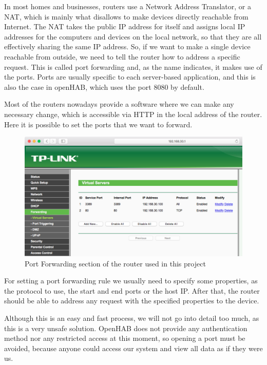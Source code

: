 In most homes and businesses, routers use a Network Address Translator, or a NAT, which is mainly what disallows to make devices
directly reachable from Internet. The NAT takes the public IP address for itself and assigns local IP addresses for the computers
and devices on the local network, so that they are all effectively sharing the same IP address. So, if we want to make a single
device reachable from outside, we need to tell the router how to address a specific request. This is called port forwarding and,
as the name indicates, it makes use of the ports. Ports are usually specific to each server-based application, and this is also the
case in openHAB, which uses the port 8080 by default.

Most of the routers nowadays provide a software where we can make any necessary change, which is accessible via HTTP in the local
address of the router. Here it is possible to set the ports that we want to forward.

\begin{figure}
	\centering
	\includegraphics[width=1\textwidth]{images/Chapter_06/port-forwarding.png}
	\caption{Port Forwarding section of the router used in this project}
	\label{fig:port-forwarding}
\end{figure}

For setting a port forwarding rule we usually need to specify some properties, as the protocol to use, the start and end ports or
the host IP. After that, the router should be able to address any request with the specified properties to the device.

Although this is an easy and fast process, we will not go into detail too much, as this is a very unsafe solution. OpenHAB does
not provide any authentication method nor any restricted access at this moment, so opening a port must be avoided, because anyone
could access our system and view all data as if they were us.

